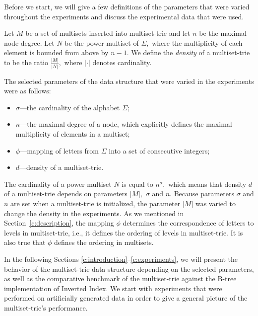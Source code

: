 \documentclass[algorithms,article,accept,pdftex,moreauthors]{Definitions/mdpi}
\begin{document}

Before we start, we will give a few definitions of the parameters 
that were varied throughout the experiments and discuss the experimental data 
that were used.

Let $M$ be a set of multisets inserted into multiset-trie and let $n$ be 
the maximal node degree. Let $N$ be the power multiset of $\Sigma,$ where 
the multiplicity of each element is bounded from above by $n-1.$ We define the 
\emph{density} of a multiset-trie to be the ratio $\frac{|M|}{|N|},$ where 
$|\cdot|$ denotes cardinality.

The selected parameters of the data structure that were varied in the experiments 
were as follows:
%
\begin{itemize}
\item $\sigma$---the cardinality of the alphabet $\Sigma;$
%
\item $n$---the maximal degree of a node, which explicitly defines the maximal 
multiplicity of elements in a multiset;
%
\item $\phi$---mapping of letters from $\Sigma$ into a set of consecutive 
integers;
%
\item $d$---density of a multiset-trie.
%
\end{itemize}
The cardinality of a power multiset $N$ is equal to $n^\sigma,$ which means that 
density $d$ of a multiset-trie depends on parameters $|M|,$ $\sigma$ and $n.$ 
Because parameters $\sigma$ and $n$ are set when a multiset-trie is initialized, 
the parameter $|M|$ was varied to change the density in the experiments. As we 
mentioned in Section~\ref{c:description}, the mapping $\phi$ determines the 
correspondence of letters to levels in multiset-trie, i.e., it defines the ordering of 
levels in multiset-trie. It is also true that $\phi$ defines the ordering in multisets.

In the following Sections \ref{c:introduction}--\ref{c:experiments}, we will present the behavior of the multiset-trie data 
structure depending on the selected parameters, as well as the comparative 
benchmark of the multiset-trie against the B-tree implementation of Inverted Index. 
We start with experiments that were performed on artificially generated data in 
order to give a general picture of the multiset-trie's performance. 
\end{document}
